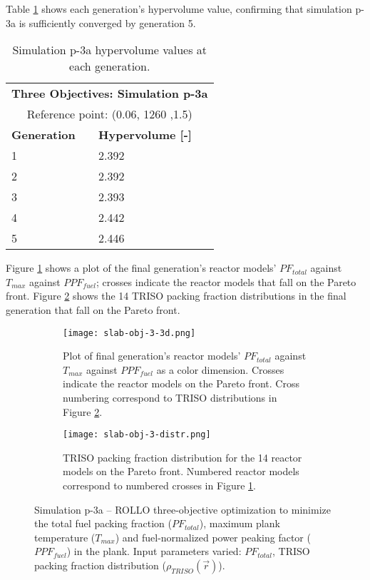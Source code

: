 Table \ref{tab:p3a-hypervolume} shows each generation's hypervolume value, 
confirming that simulation p-3a is sufficiently converged by generation 5. 
\begin{table}[htbp!]
    \centering
    \onehalfspacing
    \caption{Simulation p-3a hypervolume values at each generation.}
	\label{tab:p3a-hypervolume}
    \footnotesize
    \begin{tabular}{ll}
    \hline 
    \multicolumn{2}{c}{\textbf{Three Objectives: Simulation p-3a}} \\
    \multicolumn{2}{c}{Reference point: (0.06, 1260 ,1.5)} \\
    \hline 
    \textbf{Generation} & \textbf{Hypervolume [-]} \\
    \hline
    1 & 2.392 \\
    2 & 2.392 \\
    3 & 2.393 \\
    4 & 2.442 \\
    5 & 2.446 \\
    \hline
    \end{tabular}
\end{table}

Figure \ref{fig:slab-obj-3-3d} shows a plot of the final generation's reactor models' 
$PF_{total}$ against $T_{max}$ against $PPF_{fuel}$; crosses 
indicate the reactor models that fall on the Pareto front.
Figure \ref{fig:slab-obj-3-distr} shows the 14 TRISO packing fraction distributions in 
the final generation that fall on the Pareto front. 
\begin{figure}[htbp!]
    \begin{subfigure}{\textwidth}
        \centering
        \texttt{[image: slab-obj-3-3d.png]}
        \caption{Plot of final generation's reactor models' $PF_{total}$ against 
        $T_{max}$ against $PPF_{fuel}$ as a color dimension. 
        Crosses indicate the reactor models on the Pareto front. 
        Cross numbering correspond to TRISO distributions in Figure 
        \ref{fig:slab-obj-3-distr}.}
        \label{fig:slab-obj-3-3d} 
    \end{subfigure}
    \begin{subfigure}{\textwidth}
        \texttt{[image: slab-obj-3-distr.png]}
        \caption{TRISO packing fraction distribution for the 14 reactor models on the 
        Pareto front. Numbered reactor models correspond to numbered crosses in Figure 
        \ref{fig:slab-obj-3-3d}.}
        \label{fig:slab-obj-3-distr} 
    \end{subfigure}
    \caption{Simulation p-3a -- ROLLO three-objective optimization to minimize the total 
    fuel packing fraction ($PF_{total}$), maximum plank temperature ($T_{max}$) and 
    fuel-normalized power peaking factor ($PPF_{fuel}$) in the plank. 
    Input parameters varied: $PF_{total}$, TRISO packing fraction distribution
    ($\rho_{TRISO}(\vec{r})$).}
    \label{fig:slab-obj-3}
\end{figure}

